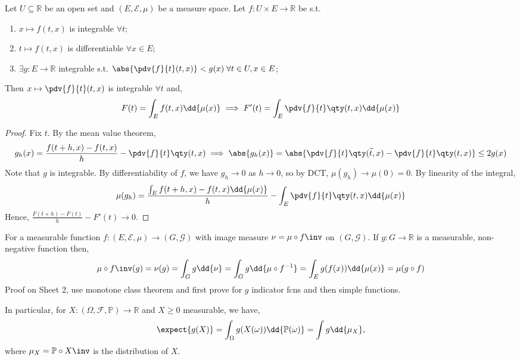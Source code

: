 \begin{theorem}
	Let $U \subseteq \mathbb R$ be an open set and $(E, \mathcal E, \mu)$ be a measure space.
	Let $f \colon U \times E \to \mathbb R$ be s.t.
	\begin{enumerate}
		\item $x \mapsto f(t, x)$ is integrable $\forall t$;
		\item $t \mapsto f(t,x)$ is differentiable $\forall x \in E$;
		\item $\exists g : E \to \mathbb{R}$ integrable s.t. $\abs{\pdv{f}{t}(t, x)} < g(x) \; \forall t \in U, x \in E$;
	\end{enumerate}
	Then $x \mapsto \pdv{f}{t}(t, x)$ is integrable $\forall t$ and,
	\[ F(t) = \int_E f(t,x) \dd{\mu(x)} \implies F'(t) = \int_E \pdv{f}{t}\qty(t,x) \dd{\mu(x)} \]
\end{theorem}

\begin{proof}
	Fix $t$.
	By the mean value theorem,
	\[ g_h(x) = \frac{f(t + h, x) - f(t, x)}{h} - \pdv{f}{t}\qty(t,x) \implies \abs{g_h(x)} = \abs{\pdv{f}{t}\qty(\widetilde t, x) - \pdv{f}{t}\qty(t, x)} \leq 2g(x) \]
	Note that $g$ is integrable.
	By differentiability of $f$, we have $g_h \to 0$ as $h \to 0$, so by DCT, $\mu(g_h) \to \mu(0) = 0$.
	By linearity of the integral,
	\[ \mu(g_h) = \frac{\int_E f(t + h, x) - f(t, x) \dd{\mu(x)}}{h} - \int_E \pdv{f}{t}\qty(t,x) \dd{\mu(x)} \]
	Hence, $\frac{F(t+h) - F(t)}{h} - F'(t) \to 0$.
\end{proof}

\begin{example}
	For a measurable function $f \colon (E, \mathcal E, \mu) \to (G, \mathcal G)$ with image measure $\nu = \mu \circ f\inv$ on $(G, \mathcal{G})$.
	If $g \colon G \to \mathbb R$ is a measurable, non-negative function then,
	\begin{align*}
		\mu \circ f\inv(g) = \nu(g) = \int_G g \dd{\nu} = \int_G g \dd{\mu\circ f^{-1}} = \int_E g(f(x)) \dd{\mu(x)} = \mu(g \circ f)
	\end{align*}
	Proof on Sheet 2, use monotone class theorem and first prove for $g$ indicator fcns and then simple functions.

	In particular, for $X : (\Omega, \mathcal{F}, \mathbb{P}) \to \mathbb{R}$ and $X \geq 0$ measurable, we have,
	\[ \expect{g(X)} = \int_\Omega g(X(\omega)) \dd{\mathbb P(\omega)} = \int g \dd{\mu_X}, \]
	where $\mu_X = \mathbb{P} \circ X\inv$ is the distribution of $X$.
\end{example}

